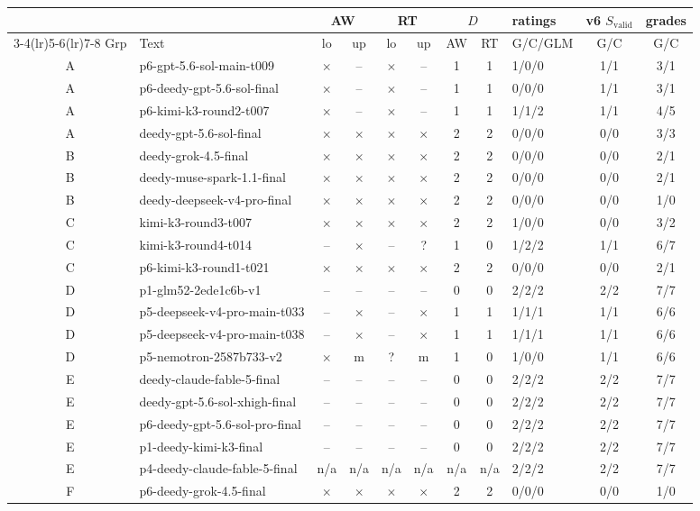 \begin{tabular}{@{}clcccccclcc@{}}
\toprule
 & & \multicolumn{2}{c}{AW} & \multicolumn{2}{c}{RT} & \multicolumn{2}{c}{$D$} & ratings & v6 $S_{\mathrm{valid}}$ & grades \\
\cmidrule(lr){3-4}\cmidrule(lr){5-6}\cmidrule(lr){7-8}
Grp & Text & lo & up & lo & up & AW & RT & G/C/GLM & G/C & G/C \\
\midrule
A & p6-gpt-5.6-sol-main-t009 & $\times$ & -- & $\times$ & -- & 1 & 1 & 1/0/0 & 1/1 & 3/1 \\
A & p6-deedy-gpt-5.6-sol-final & $\times$ & -- & $\times$ & -- & 1 & 1 & 0/0/0 & 1/1 & 3/1 \\
A & p6-kimi-k3-round2-t007 & $\times$ & -- & $\times$ & -- & 1 & 1 & 1/1/2 & 1/1 & 4/5 \\
A & deedy-gpt-5.6-sol-final & $\times$ & $\times$ & $\times$ & $\times$ & 2 & 2 & 0/0/0 & 0/0 & 3/3 \\
\addlinespace[1pt]
B & deedy-grok-4.5-final & $\times$ & $\times$ & $\times$ & $\times$ & 2 & 2 & 0/0/0 & 0/0 & 2/1 \\
B & deedy-muse-spark-1.1-final & $\times$ & $\times$ & $\times$ & $\times$ & 2 & 2 & 0/0/0 & 0/0 & 2/1 \\
B & deedy-deepseek-v4-pro-final & $\times$ & $\times$ & $\times$ & $\times$ & 2 & 2 & 0/0/0 & 0/0 & 1/0 \\
\addlinespace[1pt]
C & kimi-k3-round3-t007 & $\times$ & $\times$ & $\times$ & $\times$ & 2 & 2 & 1/0/0 & 0/0 & 3/2 \\
C & kimi-k3-round4-t014 & -- & $\times$ & -- & ? & 1 & 0 & 1/2/2 & 1/1 & 6/7 \\
C & p6-kimi-k3-round1-t021 & $\times$ & $\times$ & $\times$ & $\times$ & 2 & 2 & 0/0/0 & 0/0 & 2/1 \\
\addlinespace[1pt]
D & p1-glm52-2ede1c6b-v1 & -- & -- & -- & -- & 0 & 0 & 2/2/2 & 2/2 & 7/7 \\
D & p5-deepseek-v4-pro-main-t033 & -- & $\times$ & -- & $\times$ & 1 & 1 & 1/1/1 & 1/1 & 6/6 \\
D & p5-deepseek-v4-pro-main-t038 & -- & $\times$ & -- & $\times$ & 1 & 1 & 1/1/1 & 1/1 & 6/6 \\
D & p5-nemotron-2587b733-v2 & $\times$ & m & ? & m & 1 & 0 & 1/0/0 & 1/1 & 6/6 \\
\addlinespace[1pt]
E & deedy-claude-fable-5-final & -- & -- & -- & -- & 0 & 0 & 2/2/2 & 2/2 & 7/7 \\
E & deedy-gpt-5.6-sol-xhigh-final & -- & -- & -- & -- & 0 & 0 & 2/2/2 & 2/2 & 7/7 \\
E & p6-deedy-gpt-5.6-sol-pro-final & -- & -- & -- & -- & 0 & 0 & 2/2/2 & 2/2 & 7/7 \\
E & p1-deedy-kimi-k3-final & -- & -- & -- & -- & 0 & 0 & 2/2/2 & 2/2 & 7/7 \\
E & p4-deedy-claude-fable-5-final & n/a & n/a & n/a & n/a & n/a & n/a & 2/2/2 & 2/2 & 7/7 \\
\addlinespace[1pt]
F & p6-deedy-grok-4.5-final & $\times$ & $\times$ & $\times$ & $\times$ & 2 & 2 & 0/0/0 & 0/0 & 1/0 \\
\bottomrule
\end{tabular}
